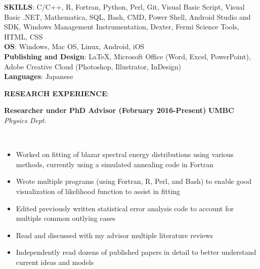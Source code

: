 \documentclass{article}
\begin{document}
\noindent \textbf{SKILLS}: C/C++, R, Fortran, Python, Perl, Git, Visual Basic Script, Visual Basic .NET, Mathematica, SQL, Bash, CMD, Power Shell, Android Studio and SDK, Windows Management Instrumentation, Dexter, Fermi Science Tools, HTML, CSS\\
\noindent \textbf{OS}: Windows, Mac OS, Linux, Android, iOS\\
\noindent \textbf{Publishing and Design}: LaTeX, Microsoft Office (Word, Excel, PowerPoint), Adobe Creative Cloud (Photoshop, Illustrator, InDesign)\\
\noindent \textbf{Languages}: Japanese\\
\newline
\par
\noindent \textbf{RESEARCH EXPERIENCE}:\\
\begin{vwcol}[widths={0.8,0.2}, sep=.8cm, justify=flush, rule=0pt, indent=0em]
\noindent \textbf{Researcher under PhD Advisor (February 2016-Present)}
\newpage
\noindent \textbf{UMBC}\\
\noindent \emph{Physics Dept.}
\end{vwcol}
\phantom \\
\begin{itemize}
\item Worked on fitting of blazar spectral energy distributions using various methods, currently using a simulated annealing code in Fortran
\item Wrote multiple programs (using Fortran, R, Perl, and Bash) to enable good visualization of likelihood function to assist in fitting
\item Edited previously written statistical error analysis code to account for multiple common outlying cases
\item Read and discussed with my advisor multiple literature reviews
\item Independently read dozens of published papers in detail to better understand current ideas and models
\end{itemize}
\end{document}
